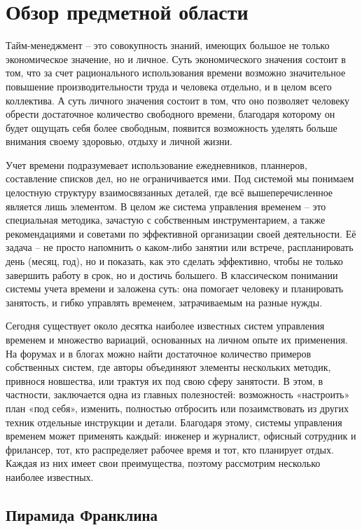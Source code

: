 \section{Обзор предметной области}
\label{sec:domain}

Тайм-менеджмент – это совокупность знаний, имеющих большое не только экономическое значение, но и личное. Суть экономического значения состоит в том,
что за счет рационального использования времени возможно значительное повышение производительности труда и человека отдельно, и в целом всего
коллектива. А суть личного значения состоит в том, что оно позволяет человеку обрести достаточное количество свободного времени, благодаря которому он будет
ощущать себя более свободным, появится возможность уделять больше внимания своему здоровью, отдыху и личной жизни.

Учет времени подразумевает использование ежедневников, планнеров, составление списков дел, но не ограничивается ими. Под системой мы понимаем целостную структуру взаимосвязанных деталей, где всё вышеперечисленное является лишь элементом. В целом же система управления временем – это специальная методика, зачастую с собственным инструментарием, а также рекомендациями и советами по эффективной организации своей деятельности. Её задача – не просто напомнить о каком-либо занятии или встрече, распланировать день (месяц, год), но и показать, как это сделать эффективно, чтобы не только завершить работу в срок, но и достичь большего. В классическом понимании системы учета времени и заложена суть: она помогает человеку и планировать занятость, и гибко управлять временем, затрачиваемым на разные нужды.

Сегодня существует около десятка наиболее известных систем управления временем и множество вариаций, основанных на личном опыте их применения. На форумах и в блогах можно найти достаточное количество примеров собственных систем, где авторы объединяют элементы нескольких методик, привнося новшества, или трактуя их под свою сферу занятости. В этом, в частности, заключается одна из главных полезностей: возможность «настроить» план «под себя», изменить, полностью отбросить или позаимствовать из других техник отдельные инструкции и детали. Благодаря этому, системы управления временем может применять каждый: инженер и журналист, офисный сотрудник и фрилансер, тот, кто распределяет рабочее время и тот, кто планирует отдых. Каждая из них имеет свои преимущества, поэтому рассмотрим несколько наиболее известных.


\subsection{Пирамида Франклина}

